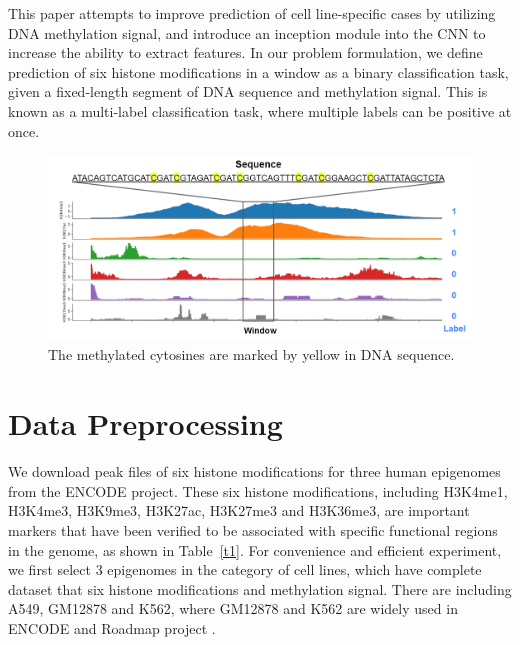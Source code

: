 \hspace{24pt}

This paper attempts to improve prediction of cell line-specific cases by utilizing DNA methylation signal, and introduce an inception module into the CNN to increase the ability to extract features. In our problem formulation, we define prediction of six histone modifications in a window as a binary classification task, given a fixed-length segment of DNA sequence and methylation signal. This is known as a multi-label classification task, where multiple labels can be positive at once.

\begin{figure}[H]
    \centering
    \includegraphics[width=1\columnwidth]{body/figure/figure3.png}
    \captionsetup{labelfont=bf}
    \renewcommand{\baselinestretch}{1.0}
    \caption[Pair of input and label]{The methylated cytosines are marked by yellow in DNA sequence.}
    \label{f3}
\end{figure}

\section{Data Preprocessing}
We download peak files of six histone modifications for three human epigenomes from the ENCODE project. These six histone modifications, including H3K4me1, H3K4me3, H3K9me3, H3K27ac, H3K27me3 and H3K36me3, are important markers that have been verified to be associated with specific functional regions in the genome, as shown in Table~\ref{t1}. For convenience and efficient experiment, we first select 3 epigenomes in the category of cell lines, which have complete dataset that six histone modifications and methylation signal. There are including A549, GM12878 and K562, where GM12878 and K562 are widely used in ENCODE and Roadmap project \cite{davis2018encyclopedia}\cite{kundaje2015integrative}.

